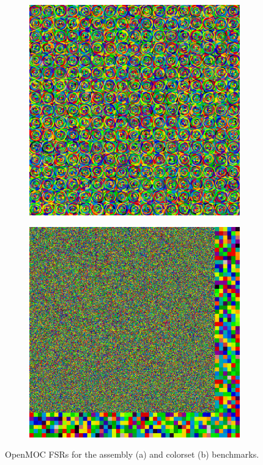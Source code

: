 \begin{figure}[h!]
\centering
\begin{subfigure}{0.42\textwidth}
  \centering
  \includegraphics[width=0.8\linewidth]{figures/assembly/fsrs}
  \caption{}
  \label{fig:benchmarks-assm-fsrs}
\end{subfigure}%
\begin{subfigure}{0.42\textwidth}
  \centering
  \includegraphics[width=0.8\linewidth]{figures/reflector/fsrs}
  \caption{}
  \label{fig:benchmarks-reflector-fsrs}
\end{subfigure}
\caption{OpenMOC FSRs for the assembly (a) and colorset (b) benchmarks.}
\label{fig:benchmarks-fsrs}
\end{figure}


